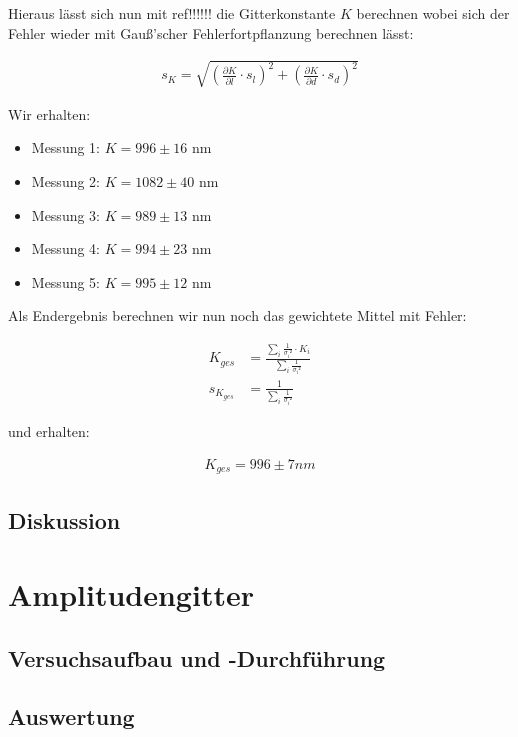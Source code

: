 \documentclass[12pt]{article}
\newcommand{\del}[2][]{\frac{\partial #1}{\partial #2}}
\begin{document}
Hieraus lässt sich nun mit ref!!!!!! die Gitterkonstante $K$ berechnen wobei sich der Fehler wieder mit Gauß'scher Fehlerfortpflanzung berechnen lässt:

\begin{align*}
s_K = \sqrt{\left(\del[K]{l}\cdot s_{l}\right)^2+\left(\del[K]{d}\cdot s_{d}\right)^2}
\end{align*}

Wir erhalten:

\begin{itemize}
\item Messung 1: $K = 996 \pm 16$ nm
\item Messung 2: $K = 1082 \pm 40$ nm
\item Messung 3: $K = 989 \pm 13$ nm
\item Messung 4: $K = 994 \pm 23$ nm
\item Messung 5: $K = 995 \pm 12$ nm
\end{itemize}

Als Endergebnis berechnen wir nun noch das gewichtete Mittel mit Fehler:

\begin{align*}
K_{ges} &=\frac{\sum\limits_i \frac{1}{\sigma_i²} \cdot K_i}{\sum\limits_i \frac{1}{\sigma_i²}}\\
s_{K_{ges}} &= \frac{1}{\sum\limits_i \frac{1}{\sigma_i²}}
\end{align*}

und erhalten:

\begin{align*}
K_{ges} = 996 \pm 7 nm
\end{align*}

\newpage
\subsection{Diskussion}

\newpage
\section{Amplitudengitter}


\subsection{Versuchsaufbau und -Durchführung}





\newpage
\subsection{Auswertung}
\end{document}
